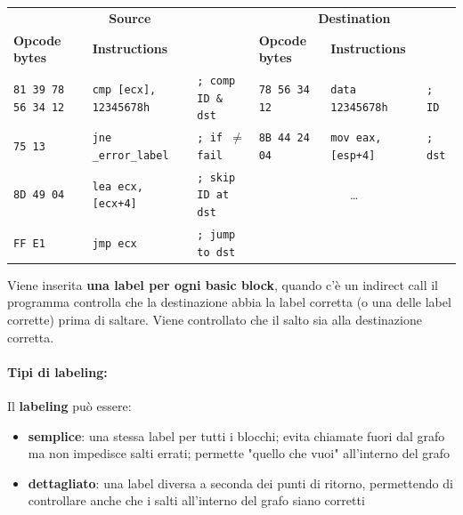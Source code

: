 \begin{table}[h!]
	\centering
	\begin{adjustbox}{max width=\textwidth}
	\begin{tabular}{@{} lll | lll @{}}
		\multicolumn{3}{c}{\bfseries Source} & \multicolumn{3}{c}{\bfseries Destination} \\
		\cmidrule(lr){1-3} \cmidrule(l){4-6}
		\bfseries Opcode bytes & \bfseries Instructions &
		& \bfseries Opcode bytes & \bfseries Instructions &\\
		\midrule
		\texttt{81 39 78 56 34 12}
		& \texttt{cmp [ecx],\,12345678h} & \texttt{; comp ID \& dst}
		& \texttt{78 56 34 12} & \texttt{data 12345678h} & \texttt{; ID} \\
		\texttt{75 13}
		& \texttt{jne \_error\_label} & \texttt{; if \(\neq\) fail}
		& \texttt{8B 44 24 04} & \texttt{mov eax, [esp+4]} & \texttt{; dst} \\
		\texttt{8D 49 04}
		& \texttt{lea ecx,[ecx+4]} & \texttt{; skip ID at dst}
		& \multicolumn{3}{c}{\dots} \\
		\texttt{FF E1}
		& \texttt{jmp ecx} & \texttt{; jump to dst}
		& & & \\
	\end{tabular}
	\end{adjustbox}
\end{table}

Viene inserita \textbf{una label per ogni basic block}, quando c'è un indirect call il programma controlla che la destinazione abbia la label corretta (o una delle label corrette) prima di saltare. Viene controllato che il salto sia alla destinazione corretta.

\paragraph{Tipi di labeling:} Il \textbf{labeling} può essere: 
\begin{itemize}
	\item \textbf{semplice}: una stessa label per tutti i blocchi; evita chiamate fuori dal grafo ma non impedisce salti errati; permette "quello che vuoi" all'interno del grafo
    
	\item \textbf{dettagliato}: una label diversa a seconda dei punti di ritorno, permettendo di controllare anche che i salti all'interno del grafo siano corretti
\end{itemize}

